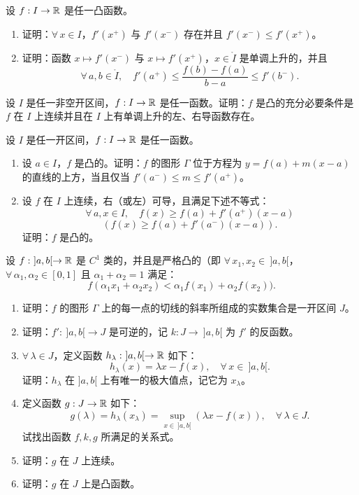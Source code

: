 \begin{exercise}
	\item 设 \(f:I\to\mathbb{R}\) 是任一凸函数。
	\begin{enumerate}[label=\arabic*)]
		\item 证明：\(\forall\,x\in I\)，\(f'(x^+)\) 与 \(f'(x^-)\) 存在并且 \(f'(x^-)\le f'(x^+)\)。
		\item 证明：函数 \(x\longmapsto f'(x^-)\) 与 \(x\longmapsto f'(x^+)\)，\(x\in\mathring I\) 是单调上升的，并且
		\[
		\forall\,a,b\in\mathring I,\quad f'(a^+)\le\frac{f(b)-f(a)}{b-a}\le f'(b^-).
		\]
	\end{enumerate}
\end{exercise}

\begin{exercise}
	\item 设 \(I\) 是任一非空开区间，\(f:I\to\mathbb{R}\) 是任一函数。证明：\(f\) 是凸的充分必要条件是 \(f\) 在 \(I\) 上连续并且在 \(I\) 上有单调上升的左、右导函数存在。
\end{exercise}

\begin{exercise}
	\item 设 \(I\) 是任一开区间，\(f:I\to\mathbb{R}\) 是任一函数。
	\begin{enumerate}[label=\arabic*)]
		\item 设 \(a\in I\)，\(f\) 是凸的。证明：\(f\) 的图形 \(\Gamma\) 位于方程为 \(y=f(a)+m(x-a)\) 的直线的上方，当且仅当 \(f'(a^-)\le m\le f'(a^+)\)。
		\item 设 \(f\) 在 \(I\) 上连续，右（或左）可导，且满足下述不等式：
		\[
		\forall\,a,x\in I,\quad f(x)\ge f(a)+f'(a^+)(x-a)
		\]
		\[
		(f(x)\ge f(a)+f'(a^-)(x-a)).
		\]
		证明：\(f\) 是凸的。
	\end{enumerate}
\end{exercise}

\begin{exercise}
	\item 设 \(f:\ ]a,b[\to\mathbb{R}\) 是 \(C^1\) 类的，并且是严格凸的（即 \(\forall\,x_1,x_2\in\ ]a,b[\)，\(\forall\,\alpha_1,\alpha_2\in[0,1]\) 且 \(\alpha_1+\alpha_2=1\) 满足：
	\[
	f(\alpha_1x_1+\alpha_2x_2)<\alpha_1f(x_1)+\alpha_2f(x_2)).
	\]
	\begin{enumerate}[label=\arabic*)]
		\item 证明：\(f\) 的图形 \(\Gamma\) 上的每一点的切线的斜率所组成的实数集合是一开区间 \(J\)。
		\item 证明：\(f':\ ]a,b[\to J\) 是可逆的，记 \(k:J\to\ ]a,b[\) 为 \(f'\) 的反函数。
		\item \(\forall\,\lambda\in J\)，定义函数 \(h_\lambda:\ ]a,b[\to\mathbb{R}\) 如下：
		\[
		h_\lambda(x)=\lambda x-f(x),\quad\forall\,x\in\ ]a,b[.
		\]
		证明：\(h_\lambda\) 在 \(]a,b[\) 上有唯一的极大值点，记它为 \(x_\lambda\)。
		\item 定义函数 \(g:J\to\mathbb{R}\) 如下：
		\[
		g(\lambda)=h_\lambda(x_\lambda)=\sup_{x\in\ ]a,b[}(\lambda x-f(x)),\quad\forall\,\lambda\in J.
		\]
		试找出函数 \(f,k,g\) 所满足的关系式。
		\item 证明：\(g\) 在 \(J\) 上连续。
		\item 证明：\(g\) 在 \(J\) 上是凸函数。
	\end{enumerate}
\end{exercise}

